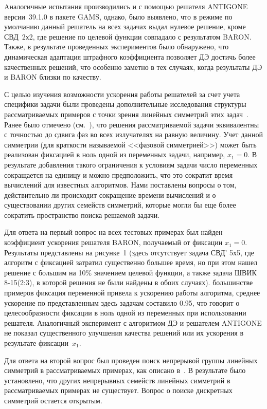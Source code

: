 Aналогичные испытания производились и с помощью решателя ANTIGONE версии~39.1.0 в пакете GAMS, однако, было выявлено, что в режиме по умолчанию данный решатель на всех задачах выдал нулевое решение, кроме СВД~2х2, где решение по целевой функции совпадало с результатом BARON.
Также, в результате проведенных экспериментов было обнаружено, что динамическая адаптация штрафного коэффициента позволяет ДЭ достичь более качественных решений, что особенно заметно в тех случаях, когда результаты ДЭ и BARON близки по качеству.

С целью изучения возможности ускорения работы решателей за счет учета специфики задачи были проведены дополнительные исследования
структуры рассматриваемых примеров с точки зрения линейных симметрий этих задач~\cite{yurkov:symmetry}.
Ранее было отмечено (см.~\cite{tyu:daor}), что решения рассматриваемой задачи эквивалентны с точностью до сдвига
фаз во всех излучателях на равную величину.
Учет данной симметрии (для краткости называемой <<фазовой симметрией>>) может
быть реализован фиксацией в ноль одной из переменных задачи, например, $x_1=0$.
В результате добавления такого ограничения к условиям задачи число переменных сокращается
на единицу и можно предположить, что это сократит время вычислений для известных алгоритмов.
Нами поставлены вопросы о том, действительно ли происходит сокращение времени вычислений и о
существовании других семейств симметрий, которые могли бы еще более сократить пространство поиска решаемой задачи.

Для ответа на первый вопрос на всех тестовых примерах был найден коэффициент ускорения решателя BARON,
получаемый от фиксации $x_1=0$. Результаты представлены на рисунке~1 (здесь отсутствует задача СВД' 5х5, где
алгоритм с фиксацией затратил существенно большее время, но при этом нашел решение с большим на 10\% значением
целевой функции, а также задача ШВИК 8-15(2:3), в которой решения не были найдены в обоих случаях).
 большинстве примеров фиксация переменной привела к ускорению работы алгоритма, среднее ускорение по
представленным здесь задачам составило 0.95, что говорит о целесообразности фиксации в ноль одной из переменных
при использовании решателя. Аналогичный эксперимент с алгоритмом ДЭ и решателем ANTIGONE не показал существенного
улучшения качества решений или их ускорения в результате фиксации~$x_1$.

Для ответа на второй вопрос был проведен поиск непрерывой группы линейных симметрий в рассматриваемых примерах,
как описано в~\cite{yurkov:symmetry}. В результате было установлено, что других непрерывных семейств линейных
симметрий в рассматриваемых примерах не существует. Вопрос о поиске дискретных симметрий остается открытым.


